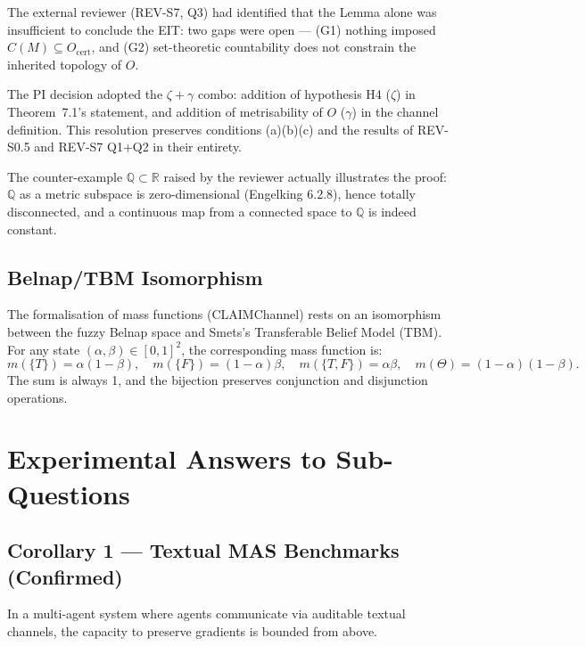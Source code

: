 \documentclass[11pt,a4paper]{article}
\theoremstyle{plain}
\begin{document}
The external reviewer (REV-S7, Q3) had identified that the Lemma alone was
insufficient to conclude the EIT: two gaps were open --- (G1) nothing imposed
$C(M) \subseteq O_\text{cert}$, and (G2) set-theoretic countability does not
constrain the inherited topology of $O$.

The PI decision adopted the $\zeta + \gamma$ combo: addition of hypothesis H4
($\zeta$) in Theorem~7.1's statement, and addition of metrisability of $O$ ($\gamma$)
in the channel definition. This resolution preserves conditions (a)(b)(c) and the
results of REV-S0.5 and REV-S7 Q1+Q2 in their entirety.

The counter-example $\mathbb{Q} \subset \mathbb{R}$ raised by the reviewer actually
illustrates the proof: $\mathbb{Q}$ as a metric subspace is zero-dimensional
(Engelking 6.2.8), hence totally disconnected, and a continuous map from a
connected space to $\mathbb{Q}$ is indeed constant.

\subsection{Belnap/TBM Isomorphism}

The formalisation of mass functions (CLAIMChannel) rests on an isomorphism between
the fuzzy Belnap space and Smets's Transferable Belief Model (TBM). For any state
$(\alpha, \beta) \in [0,1]^2$, the corresponding mass function is:
\[
  m(\{T\}) = \alpha(1-\beta), \quad m(\{F\}) = (1-\alpha)\beta, \quad
  m(\{T,F\}) = \alpha\beta, \quad m(\Theta) = (1-\alpha)(1-\beta).
\]
The sum is always 1, and the bijection preserves conjunction and disjunction
operations.

\section{Experimental Answers to Sub-Questions}

\subsection{Corollary 1 --- Textual MAS Benchmarks (Confirmed)}

In a multi-agent system where agents communicate via auditable textual channels,
the capacity to preserve gradients is bounded from above.
\end{document}

